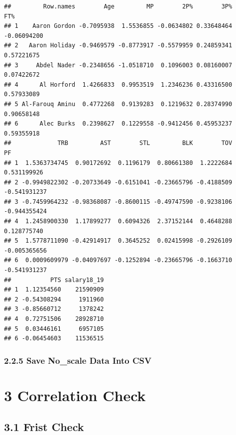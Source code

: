 \documentclass[]{article}
\begin{document}
\begin{verbatim}
##         Row.names        Age         MP        2P%        3P%         FT%
## 1    Aaron Gordon -0.7095938  1.5536855 -0.0634802 0.33648464 -0.06094200
## 2   Aaron Holiday -0.9469579 -0.8773917 -0.5579959 0.24859341  0.57221675
## 3     Abdel Nader -0.2348656 -1.0518710  0.1096003 0.08160007  0.07422672
## 4      Al Horford  1.4266833  0.9953519  1.2346236 0.43316500  0.57933089
## 5 Al-Farouq Aminu  0.4772268  0.9139283  0.1219632 0.28374990  0.90658148
## 6      Alec Burks  0.2398627  0.1229558 -0.9412456 0.45953237  0.59355918
##             TRB         AST        STL         BLK        TOV           PF
## 1  1.5363734745  0.90172692  0.1196179  0.80661380  1.2222684  0.531199926
## 2 -0.9949822302 -0.20733649 -0.6151041 -0.23665796 -0.4188509 -0.541931237
## 3 -0.7459964232 -0.98368087 -0.8600115 -0.49747590 -0.9238106 -0.944355424
## 4  1.2458900330  1.17899277  0.6094326  2.37152144  0.4648288  0.128775740
## 5  1.5778711090 -0.42914917  0.3645252  0.02415998 -0.2926109 -0.005365656
## 6  0.0009609979 -0.04097697 -0.1252894 -0.23665796 -0.1663710 -0.541931237
##           PTS salary18_19
## 1  1.12354560    21590909
## 2 -0.54308294     1911960
## 3 -0.85660712     1378242
## 4  0.72751506    28928710
## 5  0.03446161     6957105
## 6 -0.06454603    11536515
\end{verbatim}

\subsubsection{\texorpdfstring{2.2.5 Save No\_scale Data Into CSV\\
}{2.2.5 Save No\_scale Data Into CSV }}\label{save-no_scale-data-into-csv}

\section{3 Correlation Check}\label{correlation-check}

\subsection{3.1 Frist Check}\label{frist-check}
\end{document}
